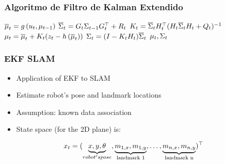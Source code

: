 \begin{frame}
    \frametitle{Algoritmo de Filtro de Kalman Extendido}
    
    \begin{algorithmic}[1]
        \State $\overline{\mu}_{t} = g\left( u_{t}, \mu_{t-1} \right)$
        \State $\overline{\Sigma}_{t} = G_{t} \Sigma_{t-1} G_{t}^{\top}+R_{t}$
        \Statex
        \State $K_{t} = \overline{\Sigma}_{t} H_{t}^{\top} (H_{t} \overline{\Sigma}_{t}  H_{t} + Q_{t})^{-1} $
        \State $\mu_{t} = \overline{\mu}_{t} + K_{t} (z_{t} - h\left( \overline{\mu}_{t} \right))$
        \State $\Sigma_{t} =  (I - K_{t} H_{t}) \overline{\Sigma}_{t}$
        \State \Return $\mu_{t}, \Sigma_{t}$
    \EndProcedure
    \end{algorithmic}
\end{frame}

\begin{frame}
    \frametitle{EKF SLAM}

    \begin{itemize}
        \item Application of EKF to SLAM
        \item Estimate robot's pose and landmark locations
        \item Assumption: known data association
        \item State space (for the 2D plane) is:
    \end{itemize}
    \[ x_t = (\underbrace{x, y, \theta}_{robot's pose}, \underbrace{m_{1,x}, m_{1,y}}_{\text{landmark 1}}, \ldots, \underbrace{m_{n,x}, m_{n,y}}_{\text{landmark n}} )^{\top} \]
\end{frame}

